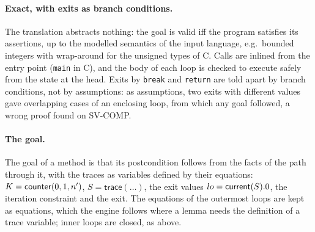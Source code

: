 \paragraph{Exact, with exits as branch conditions.}
The translation abstracts nothing: the goal is valid iff the program satisfies its assertions, up to the modelled
semantics of the input language, e.g.\ bounded integers with wrap-around for the unsigned types of C. Calls are
inlined from the entry point (\texttt{main} in C), and the body of each loop is checked to execute safely from the
state at the head. Exits by \texttt{break} and \texttt{return} are told apart by branch conditions, not by
assumptions: as assumptions, two exits with different values gave overlapping cases of an enclosing loop, from which
any goal followed, a wrong proof found on SV-COMP.

\paragraph{The goal.}
The goal of a method is that its postcondition follows from the facts of the path through it, with the
traces as variables defined by their equations: $K = \mathsf{counter}(0, 1, n')$, $S = \mathsf{trace}(\ldots)$, the
exit values $lo = \mathsf{current}(S).0$, the iteration constraint and the exit. The equations of the outermost loops are
kept as equations, which the engine follows where a lemma needs the definition of a trace variable; inner
loops are closed, as above.
